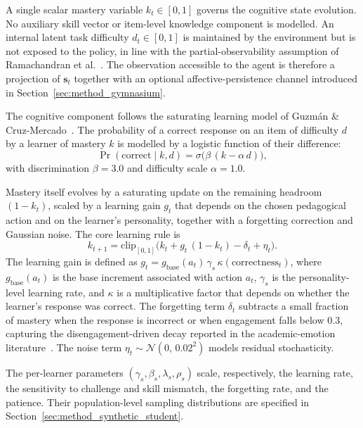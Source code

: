 A single scalar mastery variable $k_t \in [0,1]$ governs the cognitive state evolution. No auxiliary skill vector or item-level knowledge component is modelled. An internal latent task difficulty $d_t \in [0,1]$ is maintained by the environment but is not exposed to the policy, in line with the partial-observability assumption of Ramachandran et al.~\cite{ramachandran_pomdp_2018}. The observation accessible to the agent is therefore a projection of $\mathbf{s}_t$ together with an optional affective-persistence channel introduced in Section~\ref{sec:method_gymnasium}.

The cognitive component follows the saturating learning model of Guzm{\'a}n \& Cruz-Mercado~\cite{guzman_developing_2025}. The probability of a correct response on an item of difficulty $d$ by a learner of mastery $k$ is modelled by a logistic function of their difference:
\begin{equation}
    \Pr(\text{correct} \mid k, d) = \sigma\!\bigl(\beta\, (k - \alpha\, d)\bigr),
    \label{eq:irt}
\end{equation}
with discrimination $\beta = 3.0$ and difficulty scale $\alpha = 1.0$.

Mastery itself evolves by a saturating update on the remaining headroom $(1 - k_t)$, scaled by a learning gain $g_t$ that depends on the chosen pedagogical action and on the learner's personality, together with a forgetting correction and Gaussian noise. The core learning rule is
\begin{equation}
    k_{t+1} = \mathrm{clip}_{[0,1]}\!\bigl( k_t + g_t\,(1 - k_t) - \delta_t + \eta_t \bigr).
    \label{eq:knowledge_update}
\end{equation}
The learning gain is defined as $g_t = g_\mathrm{base}(a_t)\,\gamma_s\,\kappa(\text{correctness}_t)$, where $g_\mathrm{base}(a_t)$ is the base increment associated with action $a_t$, $\gamma_s$ is the personality-level learning rate, and $\kappa$ is a multiplicative factor that depends on whether the learner's response was correct. The forgetting term $\delta_t$ subtracts a small fraction of mastery when the response is incorrect or when engagement falls below $0.3$, capturing the disengagement-driven decay reported in the academic-emotion literature~\cite{pekrun_control-value_2006}. The noise term $\eta_t \sim \mathcal{N}(0,\, 0.02^2)$ models residual stochasticity.

The per-learner parameters $(\gamma_s, \beta_s, \lambda_s, \rho_s)$ scale, respectively, the learning rate, the sensitivity to challenge and skill mismatch, the forgetting rate, and the patience. Their population-level sampling distributions are specified in Section~\ref{sec:method_synthetic_student}.


